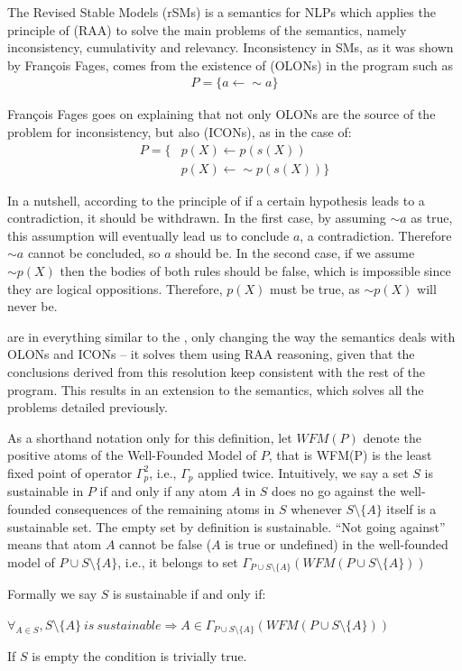 The Revised Stable Models (rSMs) is a semantics for NLPs which applies the principle of \RAA (RAA) to solve the main problems of the \sms semantics, namely inconsistency, cumulativity and relevancy. Inconsistency in SMs, as it was shown by François Fages\cite{fages}, comes from the existence of \olons (OLONs) in the program such as
\begin{align*}
P=\{a\leftarrow\sim a\}
\end{align*}

François Fages goes on explaining that not only OLONs are the source of the problem for inconsistency, but also \icons (ICONs), as in the case of:
\begin{align*}
P=\{& p(X)\leftarrow p(s(X))\\
& p(X)\leftarrow\sim p(s(X))\}
\end{align*}

In a nutshell, according to the principle of \raa if a certain hypothesis leads to a contradiction, it should be withdrawn. In the first case, by assuming $\sim a$ as true, this assumption will eventually lead us to conclude $a$, a contradiction. Therefore $\sim a$ cannot be concluded, so $a$ should be. In the second case, if we assume $\sim p(X)$ then the bodies of both rules should be false, which is impossible since they are logical oppositions. Therefore, $p(X)$ must be true, as $\sim p(X)$ will never be.

\RSMs are in everything similar to the \sms, only changing the way the semantics deals with OLONs and ICONs -- it solves them using RAA reasoning, given that the conclusions derived from this resolution keep consistent with the rest of the program. This results in an extension to the \sms semantics, which solves all the problems detailed previously.


\begin{definition}
\label{def:sustainable}
As a shorthand notation only for this definition, let $WFM(P)$ denote the positive atoms of the Well-Founded Model of $P$, that is WFM(P) is the least fixed point of operator $\Gamma_{p}^{2}$\cite{wfsDualities}, i.e., $\Gamma_{p}$ applied twice. Intuitively, we say a set $S$ is sustainable in $P$ if and only if any atom $A$ in $S$ does no go against the well-founded consequences of the remaining atoms in $S$ whenever $S\setminus\{A\}$ itself is a sustainable set. The empty set by definition is sustainable. ``Not going against'' means that atom $A$ cannot be false ($A$ is true or undefined) in the well-founded model of $P\cup S\setminus\{A\}$, i.e., it belongs to set $\Gamma_{P\cup S\setminus\{A\}}(WFM(P\cup S\setminus\{A\}))$

Formally we say $S$ is sustainable if and only if:

\begin{center}
\begin{math}
\forall_{A\in S}, S\setminus\{A\}\ is\ sustainable\Rightarrow A\in \Gamma_{P\cup
S\setminus\{A\}}\left(WFM\left(P\cup S\setminus\{A\}\right)\right)
\end{math}
\end{center}

If $S$ is empty the condition is trivially true.
\end{definition}



